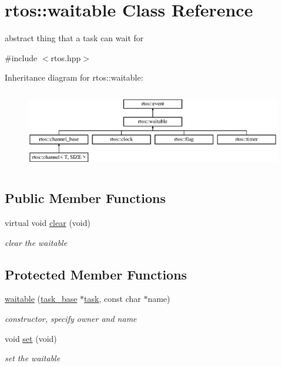 \hypertarget{classrtos_1_1waitable}{}\section{rtos\+:\+:waitable Class Reference}
\label{classrtos_1_1waitable}


abstract thing that a task can wait for  




{\ttfamily \#include $<$rtos.\+hpp$>$}

Inheritance diagram for rtos\+:\+:waitable\+:\begin{figure}[H]
\begin{center}
\leavevmode
\includegraphics[height=3.500000cm]{classrtos_1_1waitable}
\end{center}
\end{figure}
\subsection*{Public Member Functions}
\begin{DoxyCompactItemize}
\item 
virtual void \hyperlink{classrtos_1_1waitable_ac4630398f50ba7e661a64bfc491ffa10}{clear} (void)
\begin{DoxyCompactList}\small\item\em clear the waitable \end{DoxyCompactList}\end{DoxyCompactItemize}
\subsection*{Protected Member Functions}
\begin{DoxyCompactItemize}
\item 
\hyperlink{classrtos_1_1waitable_aec600b639ba55717731d3c6cfe6ff8e6}{waitable} (\hyperlink{classrtos_1_1task__base}{task\+\_\+base} $\ast$\hyperlink{classrtos_1_1task}{task}, const char $\ast$name)
\begin{DoxyCompactList}\small\item\em constructor, specify owner and name \end{DoxyCompactList}\item 
void \hyperlink{classrtos_1_1waitable_a3f1c5cfb702d4bd50b91fab1ab355bc0}{set} (void)\hypertarget{classrtos_1_1waitable_a3f1c5cfb702d4bd50b91fab1ab355bc0}{}\label{classrtos_1_1waitable_a3f1c5cfb702d4bd50b91fab1ab355bc0}

\begin{DoxyCompactList}\small\item\em set the waitable \end{DoxyCompactList}\end{DoxyCompactItemize}

